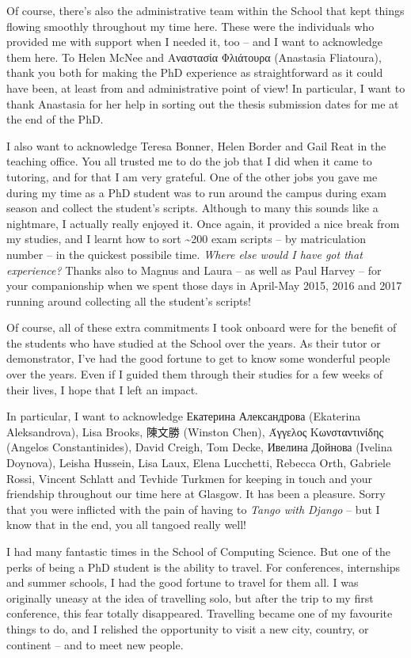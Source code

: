 \begin{preamble}
Of course, there's also the administrative team within the School that kept things flowing smoothly throughout my time here. These were the individuals who provided me with support when I needed it, too -- and I want to acknowledge them here. To Helen McNee and Αναστασία Φλιάτουρα (Anastasia Fliatoura), thank you both for making the PhD experience as straightforward as it could have been, at least from and administrative point of view! In particular, I want to thank Anastasia for her help in sorting out the thesis submission dates for me at the end of the PhD.

I also want to acknowledge Teresa Bonner, Helen Border and Gail Reat in the teaching office. You all trusted me to do the job that I did when it came to tutoring, and for that I am very grateful. One of the other jobs you gave me during my time as a PhD student was to run around the campus during exam season and collect the student's scripts. Although to many this sounds like a nightmare, I actually really enjoyed it. Once again, it provided a nice break from my studies, and I learnt how to sort \textasciitilde 200 exam scripts -- by matriculation number -- in the quickest possibile time. \emph{Where else would I have got that experience?} Thanks also to Magnus and Laura -- as well as Paul Harvey -- for your companionship when we spent those days in April-May 2015, 2016 and 2017 running around collecting all the student's scripts!

Of course, all of these extra commitments I took onboard were for the benefit of the students who have studied at the School over the years. As their tutor or demonstrator, I've had the good fortune to get to know some wonderful people over the years. Even if I guided them through their studies for a few weeks of their lives, I hope that I left an impact.

In particular, I want to acknowledge Екатерина Александрова (Ekaterina Aleksandrova), Lisa Brooks, {\asianfont 陳文勝} (Winston Chen), Άγγελος Κωνσταντινίδης (Angelos Constantinides), David Creigh, Tom Decke, Ивелина Дойнова (Ivelina Doynova), Leisha Hussein, Lisa Laux, Elena Lucchetti, Rebecca Orth, Gabriele Rossi, Vincent Schlatt and Tevhide Turkmen for keeping in touch and your friendship throughout our time here at Glasgow. It has been a pleasure. Sorry that you were inflicted with the pain of having to \emph{Tango with Django} -- but I know that in the end, you all tangoed really well!

I had many fantastic times in the School of Computing Science. But one of the perks of being a PhD student is the ability to travel. For conferences, internships and summer schools, I had the good fortune to travel for them all. I was originally uneasy at the idea of travelling solo, but after the trip to my first conference, this fear totally disappeared. Travelling became one of my favourite things to do, and I relished the opportunity to visit a new city, country, or continent -- and to meet new people.


\end{preamble}
